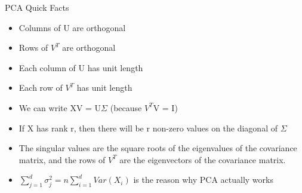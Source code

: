 \documentclass[aspectratio=169]{../latex_main/tntbeamer}  %
\begin{document}
	
	\begin{frame}{PCA Quick Facts}
	    \begin{itemize}
	        \item Columns of U are orthogonal
	        \item Rows of $V^T$ are orthogonal
	        \item Each column of U has unit length
	        \item Each row of $V^T$ has unit length
	        \item We can write XV = U$\Sigma$ (because $V^T$V = I)
	        \item If X has rank r, then there will be r non-zero values on the diagonal of $\Sigma$
	        \item The singular values are the square roots of the eigenvalues of the covariance matrix, and the rows of $V^T$ are the eigenvectors of the covariance matrix.
	        \item $\sum\limits_{j=1}^d\sigma^2_j = n\sum\limits_{i=1}^dVar(X_i)$ is the reason why PCA actually works
	    \end{itemize}
	\end{frame}
\end{document}
